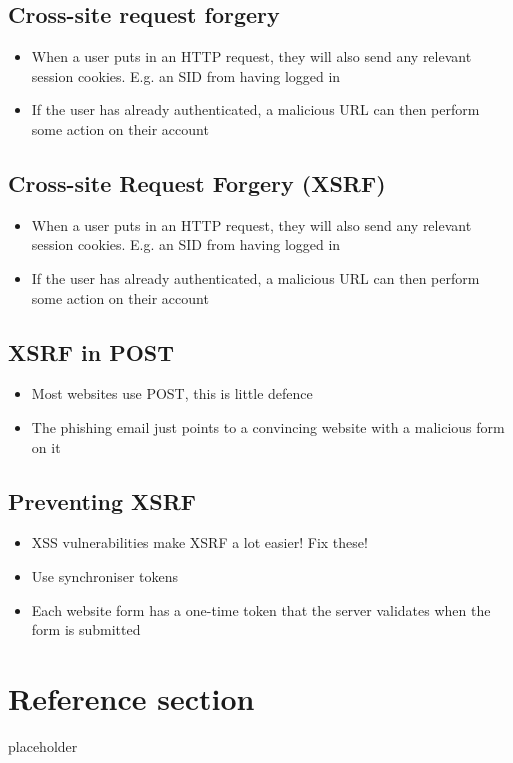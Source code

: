 \documentclass{article}
\begin{document}
\subsection{Cross-site request forgery}
\begin{itemize}
	\item When a user puts in an HTTP request, they will also send any relevant session cookies. E.g. an SID from having logged in 
	\item If the user has already authenticated, a malicious URL can then perform some action on their account
\end{itemize}

\subsection{Cross-site Request Forgery (XSRF)}
\begin{itemize}
	\item When a user puts in an HTTP request, they will also send any relevant session cookies. E.g. an SID from having logged in 
	\item If the user has already authenticated, a malicious URL can then perform some action on their account
\end{itemize}

\subsection{XSRF in POST}
\begin{itemize}
	\item Most websites use POST, this is little defence 
	\item The phishing email just points to a convincing website with a malicious form on it
\end{itemize}

\subsection{Preventing XSRF}
\begin{itemize}
	\item XSS vulnerabilities make XSRF a lot easier! Fix these! 
	\item Use synchroniser tokens 
	\item Each website form has a one-time token that the server validates when the form is submitted
\end{itemize}

\pagebreak
\section*{Reference section} \label{sec:reference}
\begin{description}
	\item[placeholder] \hfill \\
\end{description}
\end{document}
